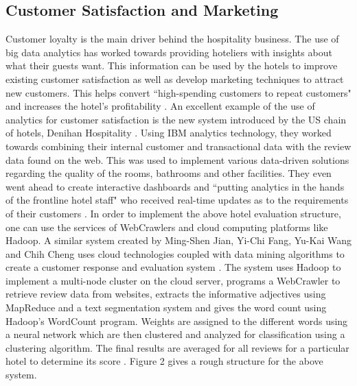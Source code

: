 \documentclass[sigconf]{acmart}
\begin{document}
\subsection{Customer Satisfaction and Marketing}
Customer loyalty is the main driver behind the hospitality business. The use of big data analytics has worked towards providing hoteliers with insights about what their guests want. This information can be used by the hotels to improve existing customer satisfaction as well as develop marketing techniques to attract new customers. This helps convert ``high-spending customers to repeat customers" and increases the hotel's profitability \cite {mauricio05}.
\newline An excellent example of the use of analytics for customer satisfaction is the new system introduced by the US chain of hotels, Denihan Hospitality \cite {bmarr06}. Using IBM analytics technology, they worked towards combining their internal customer and transactional data with the review data found on the web. This was used to implement various data-driven solutions regarding the quality of the rooms, bathrooms and other facilities. They even went ahead to create interactive dashboards and ``putting analytics in the hands of the frontline hotel staff" who received real-time updates as to the requirements of their customers \cite {bmarr06}. 
\newline In order to implement the above hotel evaluation structure, one can use the services of WebCrawlers and cloud computing platforms like Hadoop. A similar system created by Ming-Shen Jian, Yi-Chi Fang, Yu-Kai Wang and Chih Cheng uses cloud technologies coupled with data mining algorithms to create a  customer response and evaluation system \cite {jianfangwang07}. The system uses Hadoop to implement a multi-node cluster on the cloud server, programs a  WebCrawler to retrieve review data from websites, extracts the informative adjectives using MapReduce and a text segmentation system and gives the word count using Hadoop's WordCount program. Weights are assigned to the different words using a neural network which are then clustered and analyzed for classification using a clustering algorithm. The final results are averaged for all reviews for a particular hotel to determine its score \cite {jianfangwang07}. Figure 2 gives a rough structure for the above system.
\end{document}
